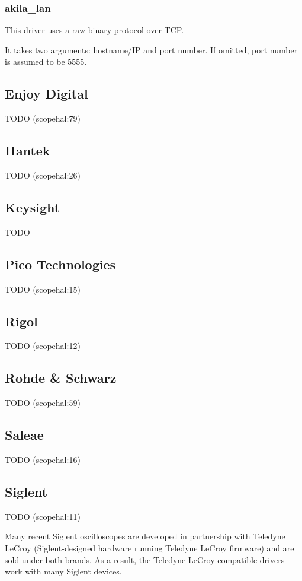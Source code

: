 \subsubsection{akila\_lan}

This driver uses a raw binary protocol over TCP.

It takes two arguments: hostname/IP and port number. If omitted, port number is assumed to be 5555.

\subsection{Enjoy Digital}
TODO (scopehal:79)

\subsection{Hantek}
TODO (scopehal:26)

\subsection{Keysight}
TODO

\subsection{Pico Technologies}
TODO (scopehal:15)

\subsection{Rigol}
TODO (scopehal:12)

\subsection{Rohde \& Schwarz}
TODO (scopehal:59)

\subsection{Saleae}
TODO (scopehal:16)

\subsection{Siglent}

TODO (scopehal:11)

Many recent Siglent oscilloscopes are developed in partnership with Teledyne LeCroy (Siglent-designed hardware running
Teledyne LeCroy firmware) and are sold under both brands. As a result, the Teledyne LeCroy compatible drivers work with
many Siglent devices.

